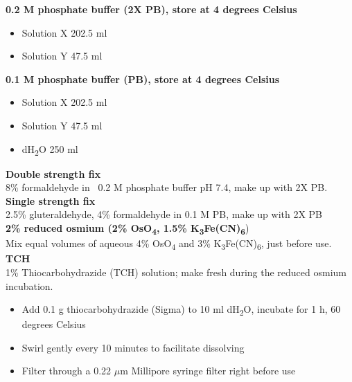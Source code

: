 \noindent
\textbf{0.2 M phosphate buffer (2X PB), store at 4 degrees Celsius}
\begin{itemize}
\item Solution X 202.5 ml 
\item Solution Y 47.5 ml 
\end{itemize}

\noindent
\textbf{0.1 M phosphate buffer (PB), store at 4 degrees Celsius}
\begin{itemize}
\item Solution X 202.5 ml 
\item Solution Y 47.5 ml 
\item dH\textsubscript{2}O 250 ml 
\end{itemize}

\noindent
\textbf{Double strength fix} \\
8\% formaldehyde in ~0.2 M phosphate buffer pH 7.4, make up with 2X PB. \\

\noindent
\textbf{Single strength fix} \\
2.5\% gluteraldehyde, 4\% formaldehyde in 0.1 M PB, make up with 2X PB \\

\noindent
\textbf{2\% reduced osmium (2\% OsO\textsubscript{4}, 1.5\% K\textsubscript{3}Fe(CN)\textsubscript{6}}) \\
Mix equal volumes of aqueous 4\% OsO\textsubscript{4} and 3\% K\textsubscript{3}Fe(CN)\textsubscript{6}, just before use. \\

\noindent
\textbf{TCH} \\
1\% Thiocarbohydrazide (TCH) solution; make fresh during the reduced osmium incubation.
\begin{itemize}
\item Add 0.1 g thiocarbohydrazide (Sigma) to 10 ml dH\textsubscript{2}O, incubate for 1 h, 60 degrees Celsius 
\item Swirl gently every 10 minutes to facilitate dissolving
\item Filter through a 0.22 $\mu$m Millipore syringe filter right before use
\end{itemize}

